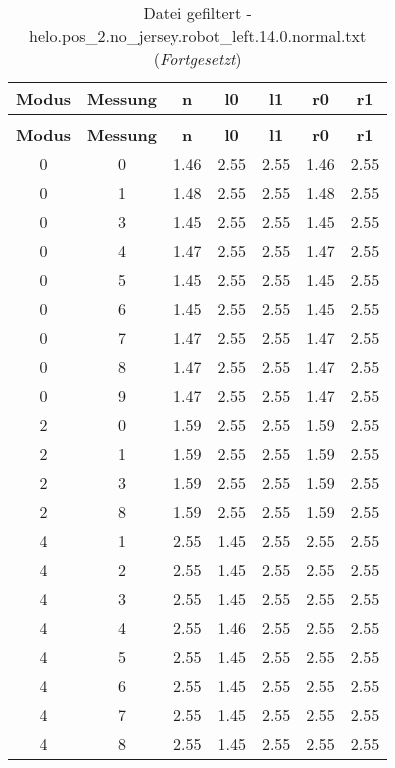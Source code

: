 \begin{longtable}{|c|c||c||c|c||c|c|}
	\caption{Datei gefiltert - helo.pos\_2.no\_jersey.robot\_left.14.0.normal.txt} \label{tab:helo.pos-2.no-jersey.robot-left.14.0.normal.txt} \\ \hline
	\textbf{Modus} & \textbf{Messung} & \textbf{n} & \textbf{l0} & \textbf{l1} & \textbf{r0} & \textbf{r1}\\ \hline
	\endfirsthead
	\caption[]{Datei gefiltert - helo.pos\_2.no\_jersey.robot\_left.14.0.normal.txt (\emph{Fortgesetzt})} \\ \hline
	\textbf{Modus} & \textbf{Messung} & \textbf{n} & \textbf{l0} & \textbf{l1} & \textbf{r0} & \textbf{r1}\\ \hline
	\endhead
	0 & 0 & 1.46 & 2.55 & 2.55 & 1.46 & 2.55 \\ \hline
	0 & 1 & 1.48 & 2.55 & 2.55 & 1.48 & 2.55 \\ \hline
	0 & 3 & 1.45 & 2.55 & 2.55 & 1.45 & 2.55 \\ \hline
	0 & 4 & 1.47 & 2.55 & 2.55 & 1.47 & 2.55 \\ \hline
	0 & 5 & 1.45 & 2.55 & 2.55 & 1.45 & 2.55 \\ \hline
	0 & 6 & 1.45 & 2.55 & 2.55 & 1.45 & 2.55 \\ \hline
	0 & 7 & 1.47 & 2.55 & 2.55 & 1.47 & 2.55 \\ \hline
	0 & 8 & 1.47 & 2.55 & 2.55 & 1.47 & 2.55 \\ \hline
	0 & 9 & 1.47 & 2.55 & 2.55 & 1.47 & 2.55 \\ \hline
	2 & 0 & 1.59 & 2.55 & 2.55 & 1.59 & 2.55 \\ \hline
	2 & 1 & 1.59 & 2.55 & 2.55 & 1.59 & 2.55 \\ \hline
	2 & 3 & 1.59 & 2.55 & 2.55 & 1.59 & 2.55 \\ \hline
	2 & 8 & 1.59 & 2.55 & 2.55 & 1.59 & 2.55 \\ \hline
	4 & 1 & 2.55 & 1.45 & 2.55 & 2.55 & 2.55 \\ \hline
	4 & 2 & 2.55 & 1.45 & 2.55 & 2.55 & 2.55 \\ \hline
	4 & 3 & 2.55 & 1.45 & 2.55 & 2.55 & 2.55 \\ \hline
	4 & 4 & 2.55 & 1.46 & 2.55 & 2.55 & 2.55 \\ \hline
	4 & 5 & 2.55 & 1.45 & 2.55 & 2.55 & 2.55 \\ \hline
	4 & 6 & 2.55 & 1.45 & 2.55 & 2.55 & 2.55 \\ \hline
	4 & 7 & 2.55 & 1.45 & 2.55 & 2.55 & 2.55 \\ \hline
	4 & 8 & 2.55 & 1.45 & 2.55 & 2.55 & 2.55 \\ \hline

\end{longtable}

